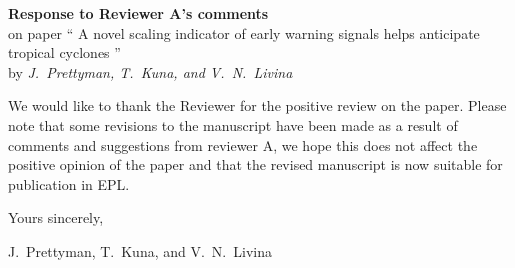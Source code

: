 \documentclass[12pt]{article}
\begin{document}
\begin{center}
{\bf Response to Reviewer A's comments}\\
on paper `` A novel scaling indicator of early warning signals helps anticipate tropical cyclones ''\\[5pt]
by {\it J.~Prettyman, T.~Kuna, and V.~N.~Livina}
\end{center}

\vspace{3mm}

\noindent We would like to thank the Reviewer for the positive review on the paper. Please note that some revisions to the manuscript have been made as a result of comments and suggestions from reviewer A, we hope this does not affect the positive opinion of the paper and that the revised manuscript is now suitable for publication in EPL.

\vspace{5mm}

\noindent
Yours sincerely,

\vspace{1mm}

\noindent
J.~Prettyman, T.~Kuna, and V.~N.~Livina
\end{document}
